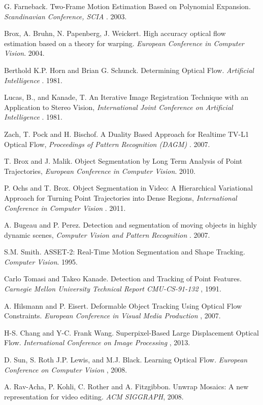 \begin{thebibliography}{99}
G. Farneback. Two-Frame Motion Estimation Based on Polynomial Expansion. {\it Scandinavian Conference, SCIA }. 2003.

Brox, A. Bruhn, N. Papenberg, J. Weickert. High accuracy optical flow estimation based on a theory for warping. {\it European Conference in Computer Vision}. 2004.

Berthold K.P. Horn and Brian G. Schunck. Determining Optical Flow. {\it Artificial Intelligence }. 1981.

Lucas, B., and Kanade, T. An Iterative Image Registration Technique with an Application to Stereo Vision, {\it International Joint Conference on Artificial Intelligence }. 1981.

Zach, T. Pock and H. Bischof. A Duality Based Approach for Realtime TV-L1 Optical Flow, {\it Proceedings of Pattern Recognition (DAGM) }. 2007.

T. Brox and J. Malik. Object Segmentation by Long Term Analysis of Point Trajectories, {\it European Conference in Computer Vision}. 2010.

P. Ochs and T. Brox. Object Segmentation in Video: A Hierarchical Variational Approach for Turning Point Trajectories into Dense Regions, {\it International Conference in Computer Vision }. 2011.

A. Bugeau and P. Perez. Detection and segmentation of moving objects in highly dynamic scenes, {\it Computer Vision and Pattern Recognition }. 2007.

S.M. Smith. ASSET-2: Real-Time Motion Segmentation and Shape Tracking. {\it Computer Vision}. 1995. 

Carlo Tomasi and Takeo Kanade. Detection and Tracking of Point Features. {\it Carnegie Mellon University Technical Report CMU-CS-91-132 }, 1991.

A. Hilsmann and P. Eisert. Deformable Object Tracking Using Optical Flow Constraints. {\it European Conference in Visual Media Production }, 2007.

H-S. Chang and Y-C. Frank Wang. Superpixel-Based Large Displacement Optical Flow. {\it International Conference on Image Processing }, 2013.

D. Sun, S. Roth J.P. Lewis, and M.J. Black. Learning Optical Flow. {\it European Conference on Computer Vision }, 2008.

A. Rav-Acha, P. Kohli, C. Rother and A. Fitzgibbon. Unwrap Mosaics: A new representation for video editing. {\it ACM SIGGRAPH}, 2008. 


\end{thebibliography}
